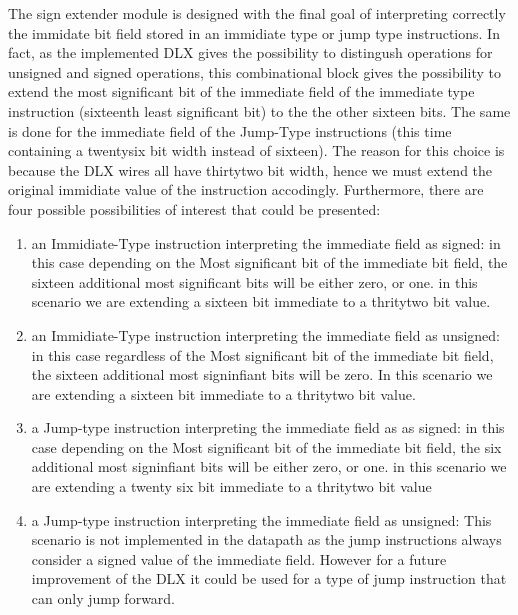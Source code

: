     The sign extender module is designed with the final goal of interpreting correctly the immidate bit field stored in an immidiate type or jump type instructions.
    In fact, as the implemented DLX gives the possibility to distingush operations for unsigned and signed operations, this combinational block 
    gives the possibility to extend the most significant bit of the immediate field of the immediate type instruction (sixteenth least significant bit) to the the other sixteen bits. 
    The same is done for the immediate field of the Jump-Type instructions (this time containing a twentysix bit width instead of sixteen).
    The reason for this choice is because the DLX wires all have thirtytwo bit width, hence we must extend the original immidiate value of the instruction accodingly.
    Furthermore, there are four possible possibilities of interest that could be presented: 
    \begin{enumerate}

        \item an Immidiate-Type instruction interpreting the immediate field as signed: in this case depending on the Most significant bit of the immediate
        bit field, the sixteen additional most significant bits will be either zero, or one. in this scenario we are extending a sixteen bit immediate to a thritytwo bit value.
        
        \item an Immidiate-Type instruction interpreting the immediate field as unsigned: in this case regardless of the Most significant bit of the immediate
        bit field, the sixteen additional most signinfiant bits will be zero. In this scenario we are extending a sixteen bit immediate to a thritytwo bit value.
     
        \item a Jump-type instruction interpreting the immediate field as as signed: in this case depending on the Most significant bit of the immediate
        bit field, the six additional most signinfiant bits will be either zero, or one. in this scenario we are extending a twenty six bit immediate to a thritytwo bit value

        \item a Jump-type instruction interpreting the immediate field as unsigned: This scenario is not implemented in the datapath as the jump instructions always consider
        a signed value of the immediate field. However for a future improvement of the DLX it could be used for a type of jump instruction that can only jump forward.

        \end{enumerate}

